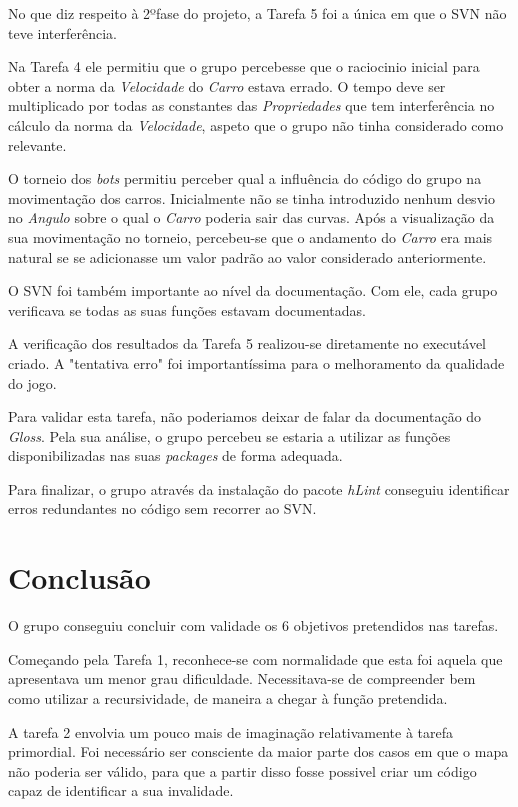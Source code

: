 \documentclass[a4paper]{report} %
\begin{document}
No que diz respeito à 2ºfase do projeto, a Tarefa 5 foi a única em que o SVN não teve interferência.

Na Tarefa 4 ele permitiu que o grupo percebesse que o raciocinio inicial para obter a norma da \emph{Velocidade} do \emph{Carro} estava errado. O tempo deve ser multiplicado por todas as constantes das \emph{Propriedades} que tem interferência no cálculo da norma da \emph{Velocidade}, aspeto que o grupo não tinha considerado como relevante.

O torneio dos \textit{bots} permitiu perceber qual a influência do código do grupo na movimentação dos carros. Inicialmente não se tinha introduzido nenhum desvio no \emph{Angulo} sobre o qual o \emph{Carro} poderia sair das curvas. Após a visualização da sua movimentação no torneio, percebeu-se que o andamento do \emph{Carro} era mais natural se se adicionasse um valor padrão ao valor considerado anteriormente.

O SVN foi também importante ao nível da documentação. Com ele, cada grupo verificava se todas as suas funções estavam documentadas.

A verificação dos resultados da Tarefa 5 realizou-se diretamente no executável criado. A "tentativa erro" foi importantíssima para o melhoramento da qualidade do jogo.

Para validar esta tarefa, não poderiamos deixar de falar da documentação do \textit{Gloss}. Pela sua análise, o grupo percebeu se estaria a utilizar as funções disponibilizadas nas suas \textit{packages} de forma adequada.

Para finalizar, o grupo através da instalação do pacote \textit{hLint} conseguiu identificar erros redundantes no código sem recorrer ao SVN.

\chapter{Conclusão}

O grupo conseguiu concluir com validade os 6 objetivos pretendidos nas tarefas.

Começando pela Tarefa 1, reconhece-se com normalidade que esta foi aquela que apresentava um menor grau dificuldade. Necessitava-se de compreender bem como utilizar a recursividade, de maneira a chegar à função pretendida.

A tarefa 2 envolvia um pouco mais de imaginação relativamente à tarefa primordial. Foi necessário ser consciente da maior parte dos casos em que o mapa não poderia ser válido, para que a partir disso fosse possivel criar um código capaz de identificar a sua invalidade.
\end{document}

